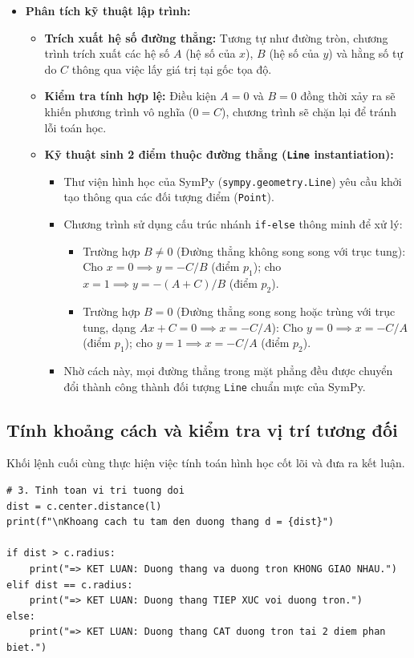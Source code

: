 \documentclass[12pt,a4paper]{article}
\begin{document}
\begin{itemize}
    \item \textbf{Phân tích kỹ thuật lập trình:}
    \begin{itemize}
        \item \textbf{Trích xuất hệ số đường thẳng:} Tương tự như đường tròn, chương trình trích xuất các hệ số $A$ (hệ số của $x$), $B$ (hệ số của $y$) và hằng số tự do $C$ thông qua việc lấy giá trị tại gốc tọa độ.
        \item \textbf{Kiểm tra tính hợp lệ:} Điều kiện $A = 0$ và $B = 0$ đồng thời xảy ra sẽ khiến phương trình vô nghĩa ($0 = C$), chương trình sẽ chặn lại để tránh lỗi toán học.
        \item \textbf{Kỹ thuật sinh 2 điểm thuộc đường thẳng (\texttt{Line} instantiation):}
        \begin{itemize}
            \item Thư viện hình học của SymPy (\texttt{sympy.geometry.Line}) yêu cầu khởi tạo thông qua các đối tượng điểm (\texttt{Point}).
            \item Chương trình sử dụng cấu trúc nhánh \texttt{if-else} thông minh để xử lý:
            \begin{itemize}
                \item Trường hợp $B \neq 0$ (Đường thẳng không song song với trục tung): Cho $x = 0 \implies y = -C/B$ (điểm $p_1$); cho $x = 1 \implies y = -(A + C)/B$ (điểm $p_2$).
                \item Trường hợp $B = 0$ (Đường thẳng song song hoặc trùng với trục tung, dạng $Ax + C = 0 \implies x = -C/A$): Cho $y = 0 \implies x = -C/A$ (điểm $p_1$); cho $y = 1 \implies x = -C/A$ (điểm $p_2$).
            \end{itemize}
            \item Nhờ cách này, mọi đường thẳng trong mặt phẳng đều được chuyển đổi thành công thành đối tượng \texttt{Line} chuẩn mực của SymPy.
        \end{itemize}
    \end{itemize}
\end{itemize}

\subsection{Tính khoảng cách và kiểm tra vị trí tương đối}

Khối lệnh cuối cùng thực hiện việc tính toán hình học cốt lõi và đưa ra kết luận.
\begin{lstlisting}
# 3. Tinh toan vi tri tuong doi
dist = c.center.distance(l)
print(f"\nKhoang cach tu tam den duong thang d = {dist}")

if dist > c.radius:
    print("=> KET LUAN: Duong thang va duong tron KHONG GIAO NHAU.")
elif dist == c.radius:
    print("=> KET LUAN: Duong thang TIEP XUC voi duong tron.")
else:
    print("=> KET LUAN: Duong thang CAT duong tron tai 2 diem phan biet.")
\end{lstlisting}
\end{document}

